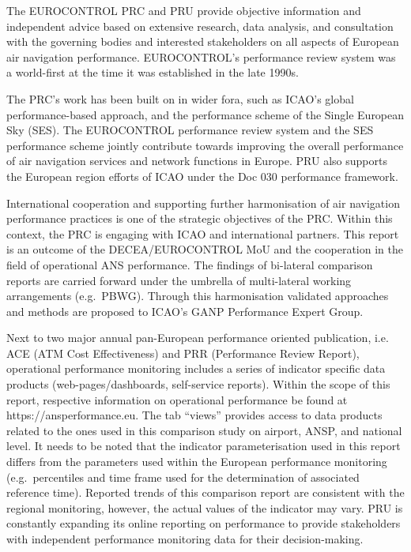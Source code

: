 \documentclass[
  a4paper,
  DIV=11,
  numbers=noendperiod]{scrreprt}
\begin{document}
The EUROCONTROL PRC and PRU provide objective information and
independent advice based on extensive research, data analysis, and
consultation with the governing bodies and interested stakeholders on
all aspects of European air navigation performance. EUROCONTROL's
performance review system was a world-first at the time it was
established in the late 1990s.

The PRC's work has been built on in wider fora, such as ICAO's global
performance-based approach, and the performance scheme of the Single
European Sky (SES). The EUROCONTROL performance review system and the
SES performance scheme jointly contribute towards improving the overall
performance of air navigation services and network functions in Europe.
PRU also supports the European region efforts of ICAO under the Doc 030
performance framework.

International cooperation and supporting further harmonisation of air
navigation performance practices is one of the strategic objectives of
the PRC. Within this context, the PRC is engaging with ICAO and
international partners. This report is an outcome of the
DECEA/EUROCONTROL MoU and the cooperation in the field of operational
ANS performance. The findings of bi-lateral comparison reports are
carried forward under the umbrella of multi-lateral working arrangements
(e.g.~PBWG). Through this harmonisation validated approaches and methods
are proposed to ICAO's GANP Performance Expert Group.

Next to two major annual pan-European performance oriented publication,
i.e. ACE (ATM Cost Effectiveness) and PRR (Performance Review Report),
operational performance monitoring includes a series of indicator
specific data products (web-pages/dashboards, self-service reports).
Within the scope of this report, respective information on operational
performance be found at https://ansperformance.eu. The tab ``views''
provides access to data products related to the ones used in this
comparison study on airport, ANSP, and national level. It needs to be
noted that the indicator parameterisation used in this report differs
from the parameters used within the European performance monitoring
(e.g.~percentiles and time frame used for the determination of
associated reference time). Reported trends of this comparison report
are consistent with the regional monitoring, however, the actual values
of the indicator may vary. PRU is constantly expanding its online
reporting on performance to provide stakeholders with independent
performance monitoring data for their decision-making.
\end{document}

